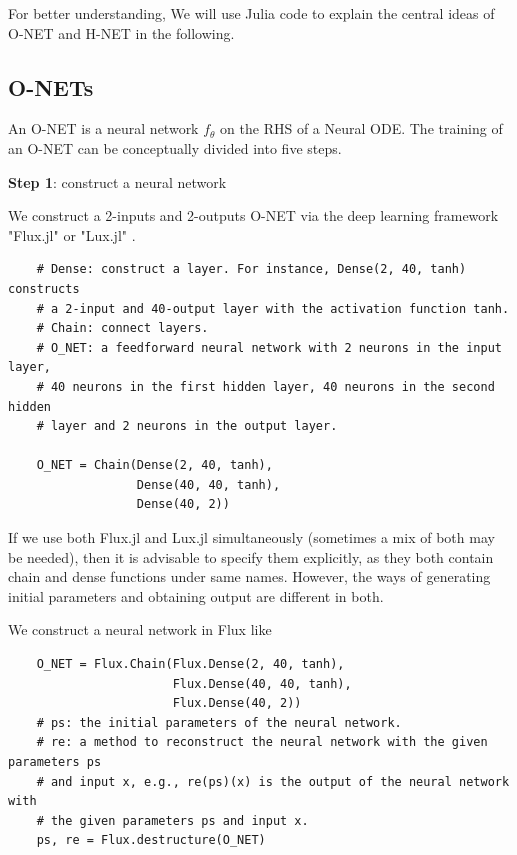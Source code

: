 \documentclass[
	parskip, 			   %
	twoside, 			   %
	DIV=14, 			   %
	BCOR=15.0mm, 		   %
	headsepline, 		   %
	open=right, 		   %
	captions=tableheading, %
	bibliography=totoc,    %
	numbers=noenddot       %
]{scrreprt}
\begin{document}
For better understanding, We will use Julia code to explain the central ideas of O-NET and H-NET in the following.

\subsection{O-NETs}
An O-NET is a neural network $f_{\theta}$ on the RHS of a Neural ODE. The training of an O-NET can be conceptually divided into five steps.

\textbf{Step 1}: construct a neural network

We construct a 2-inputs and 2-outputs O-NET via the deep learning framework "Flux.jl" or "Lux.jl" \cite{pal2022lux}.
\begin{verbatim}
    # Dense: construct a layer. For instance, Dense(2, 40, tanh) constructs 
    # a 2-input and 40-output layer with the activation function tanh.
    # Chain: connect layers.
    # O_NET: a feedforward neural network with 2 neurons in the input layer,
    # 40 neurons in the first hidden layer, 40 neurons in the second hidden 
    # layer and 2 neurons in the output layer.

    O_NET = Chain(Dense(2, 40, tanh),
                  Dense(40, 40, tanh),
                  Dense(40, 2))
\end{verbatim}

If we use both Flux.jl and Lux.jl simultaneously (sometimes a mix of both may be needed), then it is advisable to specify them explicitly, as they both contain chain and dense functions under same names. However, the ways of generating initial parameters and obtaining output are different in both.

We construct a neural network in Flux like
\begin{verbatim}
    O_NET = Flux.Chain(Flux.Dense(2, 40, tanh),
                       Flux.Dense(40, 40, tanh),
                       Flux.Dense(40, 2))
    # ps: the initial parameters of the neural network. 
    # re: a method to reconstruct the neural network with the given parameters ps 
    # and input x, e.g., re(ps)(x) is the output of the neural network with 
    # the given parameters ps and input x.
    ps, re = Flux.destructure(O_NET)
\end{verbatim}
\end{document}
